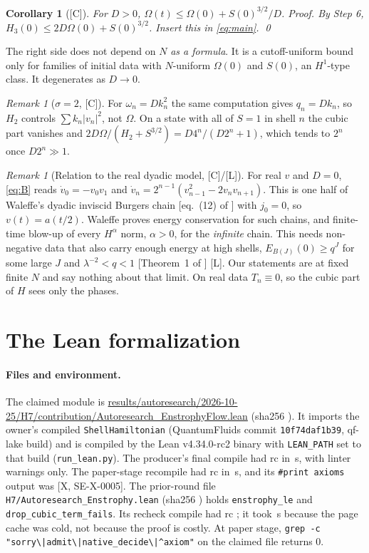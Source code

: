 \documentclass[11pt]{article}
\newcommand{\hash}[1]{{\ttfamily\expandafter\seqsplit\expandafter{#1}}}
\newtheorem{corollary}[theorem]{Corollary}
\theoremstyle{remark}
\newtheorem{remark}[theorem]{Remark}
\newcommand{\tier}[1]{\textsf{[#1]}}
\newcommand{\lean}[1]{\texttt{#1}}
\begin{document}
\begin{corollary}[\tier{C}]\label{cor:omega}
For $D>0$, $\Omega(t)\le\Omega(0)+S(0)^{3/2}/D$. \emph{Proof.} By Step 6, $H_3(0)\le2D\Omega(0)+S(0)^{3/2}$. Insert this in
\eqref{eq:main}. \qed
\end{corollary}
The right side does not depend on $N$ \emph{as a formula}. It is a cutoff-uniform bound only for families of initial data
with $N$-uniform $\Omega(0)$ and $S(0)$, an $H^1$-type class. It degenerates as $D\to0$.

\begin{remark}[$\sigma=2$, \tier{C}]
For $\omega_n=Dk_n^2$ the same computation gives $q_n=Dk_n$, so $H_2$ controls $\sum k_n|v_n|^2$, not $\Omega$. On a state
with all of $S=1$ in shell $n$ the cubic part vanishes and $2D\Omega/(H_2+S^{3/2})=D4^n/(D2^n+1)$, which tends to $2^n$ once $D2^n\gg1$.
\end{remark}

\begin{remark}[Relation to the real dyadic model, \tier{C}/\tier{L}]
For real $v$ and $D=0$, \eqref{eq:B} reads $\dot v_0=-v_0v_1$ and
$\dot v_n=2^{n-1}(v_{n-1}^2-2v_nv_{n+1})$. This is one half of Waleffe's dyadic inviscid Burgers chain [eq.~(12) of
\cite{waleffe}] with $j_0=0$, so $v(t)=a(t/2)$. Waleffe proves energy conservation for such chains, and finite-time blow-up of every
$H^\alpha$ norm, $\alpha>0$, for the \emph{infinite} chain. This needs non-negative data that also carry enough energy at high
shells, $E_{B(J)}(0)\ge q^J$ for some large $J$ and $\lambda^{-2}<q<1$ [Theorem~1 of \cite{waleffe}] \tier{L}.
Our statements are at fixed finite $N$ and say nothing about that limit. On real data $T_n\equiv0$, so the cubic part
of $H$ sees only the phases.
\end{remark}

\section{The Lean formalization}\label{sec:lean}

\paragraph{Files and environment.} The claimed module is
\url{results/autoresearch/2026-10-25/H7/contribution/Autoresearch_EnstrophyFlow.lean} (sha256 \hash{\FlowSha}).
It imports the owner's compiled \lean{ShellHamiltonian} (QuantumFluids commit \texttt{10f74daf1b39}, qf-lake build) and
is compiled by the Lean v4.34.0-rc2 binary with \texttt{LEAN\_PATH} set to that build (\texttt{run\_lean.py}). The producer's
final compile had rc \FlowRc{} in \FlowSeconds{}\,s, with linter warnings only. The paper-stage recompile had rc \RerunRc{} in
\RerunSeconds{}\,s, and its \lean{\#print axioms} output was \RerunSame{} \tier{X, SE-X-0005}. The prior-round file
\texttt{H7/Autoresearch\_Enstrophy.lean} (sha256 \hash{\PriorSha}) holds \lean{enstrophy\_le} and
\lean{drop\_cubic\_term\_fails}. Its recheck compile had rc \PriorRc{}; it took \PriorSeconds{}\,s because the page cache was cold, not because the
proof is costly. At paper stage, \texttt{grep -c "sorry\textbackslash|admit\textbackslash|native\_decide\textbackslash|\^{}axiom"} on the
claimed file returns 0.
\end{document}
